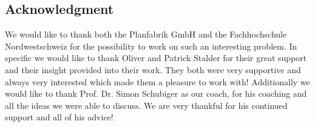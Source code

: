 \subsection{Acknowledgment}
We would like to thank both the Planfabrik GmbH and the Fachhochschule Nordwestschweiz for the possibility to work on such an interesting problem. In specific we would like to thank Oliver and Patrick Stalder for their great support and their insight provided into their work. They both were very supportive and always very interested which made them a pleasure to work with! Additionally we would like to thank Prof. Dr. Simon Schubiger as our coach, for his coaching and all the ideas we were able to discuss. We are very thankful for his continued support and all of his advice!
